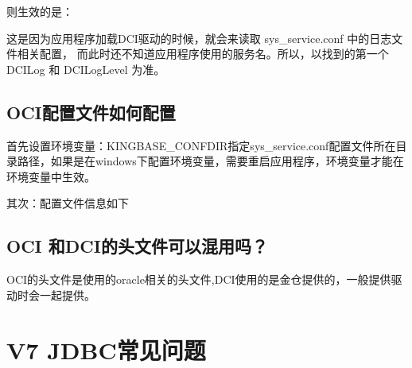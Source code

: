 \documentclass[a4,10pt,oneside,english]{sphinxmanual}
\begin{document}
则生效的是：

\begin{sphinxVerbatim}[commandchars=\\\{\}]
\PYG{p}{[}\PYG{p}{]}
\end{sphinxVerbatim}

这是因为应用程序加载DCI驱动的时候，就会来读取 sys\_service.conf 中的日志文件相关配置，  而此时还不知道应用程序使用的服务名。所以，以找到的第一个 DCILog 和 DCILogLevel 为准。


\subsection{OCI配置文件如何配置}
\label{\detokenize{interface/oci-v7:id3}}
首先设置环境变量：KINGBASE\_CONFDIR指定sys\_service.conf配置文件所在目录路径，如果是在windows下配置环境变量，需要重启应用程序，环境变量才能在环境变量中生效。

其次：配置文件信息如下

\begin{sphinxVerbatim}[commandchars=\\\{\}]
\PYG{p}{[}\PYG{p}{]}
\end{sphinxVerbatim}


\subsection{OCI 和DCI的头文件可以混用吗？}
\label{\detokenize{interface/oci-v7:oci-dci}}
OCI的头文件是使用的oracle相关的头文件,DCI使用的是金仓提供的，一般提供驱动时会一起提供。


\section{V7 JDBC常见问题}
\label{\detokenize{interface/jdbc-v7:v7-jdbc}}\label{\detokenize{interface/jdbc-v7::doc}}
\end{document}
